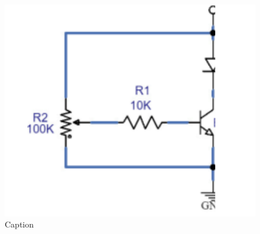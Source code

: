 \documentclass[12pt]{article}
\begin{document}
    
    \begin{figure}[h!]
        \centering
        \includegraphics[width=0.5\linewidth]{setup.png}
        \caption{Caption}
        \label{fig:enter-label}
    \end{figure}
    \begin{multicols}{2}
    \begin{center}
        
   
    \columnbreak
    \end{center}
    \end{multicols}
    
\end{document}
